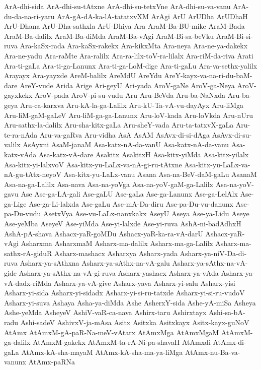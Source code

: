 {ArA-dhi-sida
ArA-dhi-su-tAtxne
ArA-dhi-su-tetxVne
ArA-dhi-su-va-vanu
ArA-du-da-na-ri-yaru
ArA-gA-dA-ka-lA-tatatxvXM
ArAgi
ArU
ArUDha
ArUDhaH
ArU-Dhana
ArU-Dha-sathxla
ArU-Dhiya
Ara
AraM-Ba-BU-mike
AraM-Bada
AraM-Ba-dalilx
AraM-Ba-diMda
AraM-Ba-vAgi
AraM-Bi-sa-beVku
AraM-Bi-si-ruva
Ara-kaSx-rada
Ara-kaSx-rakekx
Ara-kikxMta
Ara-neya
Ara-ne-ya-dakekx
Ara-ne-yadu
Ara-raMte
Ara-ralilx
Ara-ra-lilx-toV-ra-lilalx
Ara-riM-da-riva
Arati
Ara-ti-gaLa
Ara-ti-ga-Lanunx
Ara-ti-ga-LoM-dige
Ara-ti-gaLu
Ara-va-sethx-yalilx
Arayayx
Ara-yayxde
AreM-balilx
AreMdU
AreYdu
AreY-kayx-va-na-ri-du-baM-dare
AreY-vude
Arida
Arige
Ari-geyU
Ari-yada
AroV-gaNe
AroV-ga-Neya
AroV-gayxkekx
AroV-pada
AroV-pi-su-vudu
Aru
Aru-BeVda
Aru-ba-NaNxda
Aru-ba-geya
Aru-ca-karxva
Aru-kA-la-ga-Lalilx
Aru-kU-Ta-vA-vu-dayAyx
Aru-liMga
Aru-liM-gaM-gaLeV
Aru-liM-ga-ga-Lanunx
Aru-loV-kada
Aru-loVkda
Aru-nUru
Aru-sathx-la-dalilx
Aru-sha-kitx-gaLa
Aru-sheY-vada
Aru-ta-tatxvX-gaLa
Aru-te-ra-nAda
Aru-va-gaRva
Aru-vidha
AsA
AsAM
AsAvx-di-si-dAga
AsAvx-di-su-valilx
AsAyxni
AsaM-janaM
Asa-katx-nA-da-vanU
Asa-katx-nA-da-vanu
Asa-katx-vAda
Asa-katx-vA-dare
Asakitx
AsakitxH
Asa-kitx-yiMda
Asa-kitx-yilalx
Asa-kitx-yi-lalxvoV
Asa-kitx-yu-LaLx-va-nA-gi-ru-tAtxne
Asa-kitx-yu-LaLx-va-nA-gu-tAtx-neyoV
Asa-kitx-yu-LaLx-vanu
Asana
Asa-na-BeV-daM-gaLu
AsanaM
Asa-na-ga-Lalilx
Asa-nava
Asa-na-yoVga
Asa-na-yoV-gaM-ga-Lalilx
Asa-na-yoV-gavu
Ase
Ase-ga-LA-gali
Ase-gaLU
Ase-gaLa
Ase-ga-Lanunx
Ase-ga-LelAlx
Ase-ga-Lige
Ase-ga-Li-lalxda
Ase-gaLu
Ase-mA-Da-diru
Ase-pa-Du-vu-danunx
Ase-pa-Du-vudu
AsetxVya
Ase-vu-LaLx-nanxkakx
AseyU
Aseya
Ase-ya-Lidu
Aseye
Ase-yeMba
AseyeV
Ase-yiMda
Ase-yi-lalxde
Ase-yi-ruva
AshA-ni-badAdhxH
AshA-pA-shava
Ashacx-yaR-goMDu
Ashacx-yaR-ka-ra-vA-darU
Ashacx-yaR-vAgi
Asharxma
AsharxmaM
Asharx-ma-dalilx
Asharx-ma-ga-Lalilx
Asharx-ma-sathx-rA-giduR
Asharx-mashacx
Asharxya
Asharx-yada
Asharx-ya-niV-Da-di-ruva
Asharx-ya-sAthxna
Asharx-ya-sAthx-na-vA-galu
Asharx-ya-sAthx-na-vA-gide
Asharx-ya-sAthx-na-vA-gi-ruva
Asharx-yashacx
Asharx-ya-vAda
Asharx-ya-vA-dadx-riMda
Asharx-ya-vA-give
Asharx-yava
Asharx-yi-salu
Asharx-yisi
Asharx-yi-sida
Asharx-yi-sidadx
Asharx-yi-si-ru-tatxde
Asharx-yi-si-ru-vudoV
Asharx-yi-suva
Ashaya
Asha-ya-diMda
Ashe
AsherxY-sida
Ashe-yA-miSa
Asheya
Ashe-yeMda
AsheyeV
AshiV-vaR-ca-nava
Ashirx-taru
Ashirxtayx
Ashi-sa-bA-radu
Ashi-sadeV
AshivxV-ja-mAsa
Asitx
Asitxka
Asitxkayx
Asitx-kayx-guNoV
AtAmx
AtAmxM-gA-paR-Na-meV-vAtarx
AtAmxMga
AtAmxMgaM
AtAmxM-ga-dalilx
AtAmxM-gakekx
AtAmxM-ta-rA-Ni-pa-shavaH
AtAmxdi
AtAmx-di-gaLa
AtAmx-kA-sha-mayaM
AtAmx-kA-sha-ma-ya-liMga
AtAmx-nu-Ba-va-vanunx
AtAmx-paRNa
}

